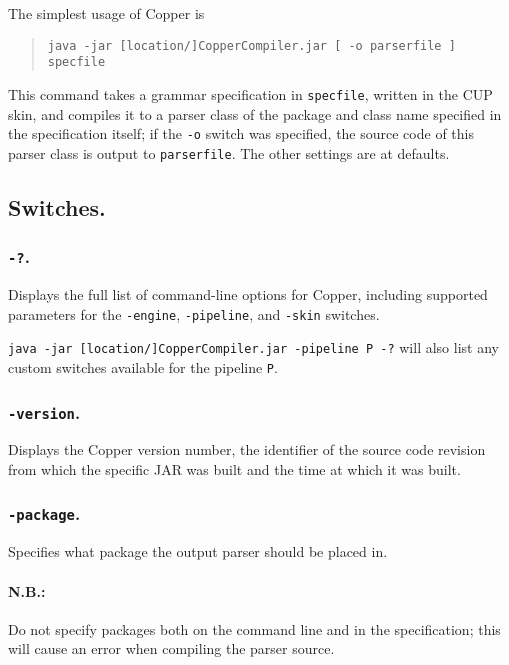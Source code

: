 \documentclass[12pt,english,twoside]{report}
\begin{document}
The simplest usage of Copper is

\begin{quote}
\texttt{java -jar [location/]CopperCompiler.jar [~-o parserfile~] specfile}
\end{quote}
This command takes a grammar specification in \texttt{specfile},
written in the CUP skin, and compiles it to a parser class of the
package and class name specified in the specification itself; if the
\texttt{-o} switch was specified, the source code of this parser class
is output to \texttt{parserfile}. The other settings are at defaults.


\subsection{Switches.}

\subsubsection{\texttt{-?}.}

Displays the full list of command-line options for Copper, including
supported parameters for the \texttt{-engine}, \texttt{-pipeline},
and \texttt{-skin} switches.

\texttt{java -jar [location/]CopperCompiler.jar -pipeline P -?} will
also list any custom switches available for the pipeline \texttt{P}.

\subsubsection{\texttt{-version}.}

Displays the Copper version number, the identifier of the source code
revision from which the specific JAR was built and the time at which
it was built.

\subsubsection{\texttt{-package}.}

Specifies what package the output parser should be placed in.

\paragraph{N.B.:}

Do not specify packages both on the command line and in the specification;
this will cause an error when compiling the parser source.
\end{document}
